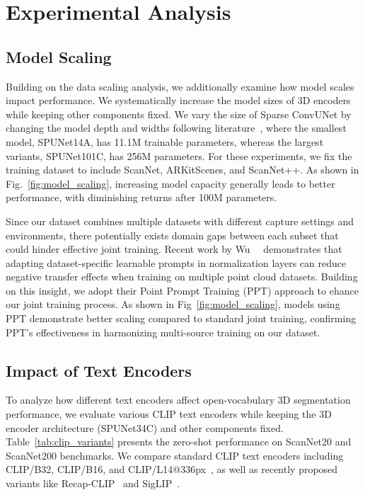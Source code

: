 \section{Experimental Analysis}

\subsection{Model Scaling }
Building on the data scaling analysis, we additionally examine how model scales impact performance. 
We systematically increase the model sizes of 3D encoders while keeping other components fixed. 
We vary the size of Sparse ConvUNet by changing the model depth and widths following literature~\cite{he2016deep}, where the smallest model, SPUNet14A, has 11.1M trainable parameters, whereas the largest variants, SPUNet101C, has 256M parameters.
For these experiments, we fix the training dataset to include ScanNet, ARKitScenes, and ScanNet++.
As shown in Fig.~\ref{fig:model_scaling}, increasing model capacity generally leads to better performance, with diminishing returns after 100M parameters.

Since our \nickname dataset combines multiple datasets with different capture settings and environments, there potentially exists domain gaps between each subset that could hinder effective joint training.
Recent work by Wu~\etal~\cite{wu2023towards} demonstrates that adapting dataset-specific learnable prompts in normalization layers can reduce negative transfer effects when training on multiple point cloud datasets.
Building on this insight, we adopt their Point Prompt Training (PPT) approach to ehance our joint training process.
As shown in Fig~\ref{fig:model_scaling}, models using PPT demonstrate better scaling compared to standard joint training, confirming PPT's effectiveness in harmonizing multi-source training on our dataset.




\subsection{Impact of Text Encoders}
To analyze how different text encoders affect open-vocabulary 3D segmentation performance, we evaluate various CLIP text encoders while keeping the 3D encoder architecture (SPUNet34C) and other components fixed. 
Table~\ref{tab:clip_variants} presents the zero-shot performance on ScanNet20 and ScanNet200 benchmarks. 
We compare standard CLIP text encoders including CLIP/B32, CLIP/B16, and CLIP/L14@336px~\cite{radfordLearningTransferableVisual2021}, as well as recently proposed variants like Recap-CLIP~\cite{li2024if} and SigLIP~\cite{zhai2023sigmoid}.


